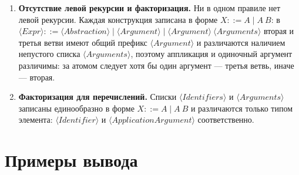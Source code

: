\documentclass{article}
\begin{document}
\begin{enumerate}
    \texttt{\textbackslash x y. y x \textbackslash x.x}, что эквивалентно \texttt{\textbackslash x y. ((y x) (\textbackslash x.x))}; это обеспечивает правило
    $\langle ApplicationArgument \rangle ::= \langle Argument \rangle \mid \langle Abstraction \rangle$.
    \item \textbf{Отсутствие левой рекурсии и факторизация.} Ни в одном правиле нет левой рекурсии. Каждая конструкция записана в форме $X ::= A \mid A \ B$: в $\langle Expr \rangle ::= \langle Abstraction \rangle \mid \langle Argument \rangle \mid \langle Argument \rangle \ \langle Arguments \rangle$ вторая и третья ветви имеют общий префикс $\langle Argument \rangle$ и различаются наличием непустого списка $\langle Arguments \rangle$, поэтому аппликация и одиночный аргумент различимы: за атомом следует хотя бы один аргумент --- третья ветвь, иначе --- вторая.
    \item \textbf{Факторизация для перечислений.} Списки $\langle Identifiers \rangle$ и $\langle Arguments \rangle$ записаны единообразно в форме $X ::= A \mid A \ B$ и различаются только типом элемента: $\langle Identifier \rangle$ и $\langle ApplicationArgument \rangle$ соответственно.
\end{enumerate}

\section{Примеры вывода}
\end{document}
